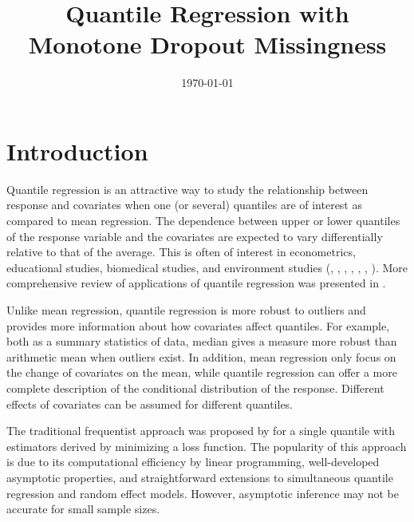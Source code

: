 \documentclass[12pt]{article}
\title{Quantile Regression with Monotone Dropout Missingness}
\date{\today}
\author{}
\begin{document}
\maketitle

\begin{abstract}
\end{abstract}

\section{Introduction}

Quantile regression is an attractive way to study the relationship
between response and covariates when one (or several) quantiles are of
interest as compared to mean regression.  The dependence between upper
or lower quantiles of the response variable and the covariates are
expected to vary differentially relative to that of the average. This
is often of interest in econometrics, educational studies, biomedical
studies, and environment studies (\citet{yu2001},
\citet{buchinsky1994}, \citet{buchinsky1998}, \citet{he1998},
\citet{koenker1999}, \citet{wei2006}, \citet{yu2003}). More
comprehensive review of applications of quantile regression was
presented in \citet{koenker2005}.

Unlike mean regression, quantile regression is more robust to outliers
and provides more information about how covariates affect
quantiles. For example, both as a summary statistics of data, median
gives a measure more robust than arithmetic mean when outliers
exist. In addition, mean regression only focus on the change of
covariates on the mean, while quantile regression can offer a more
complete description of the conditional distribution of the
response. Different effects of covariates can be assumed for different
quantiles.

The traditional frequentist approach was proposed by
\citet{koenker1978} for a single quantile with estimators derived by
minimizing a loss function. The popularity of this approach is due to
its computational efficiency by linear programming, well-developed
asymptotic properties, and straightforward extensions to simultaneous
quantile regression and random effect models. However, asymptotic
inference may not be accurate for small sample sizes.
\end{document}
